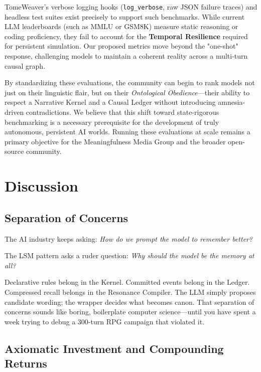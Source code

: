 \documentclass[12pt, a4paper]{article}
\begin{document}
TomeWeaver's verbose logging hooks (\texttt{log\_verbose}, raw JSON failure traces) and headless test suites exist precisely to support such benchmarks. While current LLM leaderboards (such as MMLU or GSM8K) measure static reasoning or coding proficiency, they fail to account for the \textbf{Temporal Resilience} required for persistent simulation. Our proposed metrics move beyond the "one-shot" response, challenging models to maintain a coherent reality across a multi-turn causal graph. 

By standardizing these evaluations, the community can begin to rank models not just on their linguistic flair, but on their \textit{Ontological Obedience}---their ability to respect a Narrative Kernel and a Causal Ledger without introducing amnesia-driven contradictions. We believe that this shift toward state-rigorous benchmarking is a necessary prerequisite for the development of truly autonomous, persistent AI worlds. Running these evaluations at scale remains a primary objective for the Meaningfulness Media Group and the broader open-source community.



\newpage
\section{Discussion}
\label{sec:discussion}

\subsection{Separation of Concerns}

The AI industry keeps asking: \textit{How do we prompt the model to remember better?} 

The LSM pattern asks a ruder question: \textit{Why should the model be the memory at all?} 

Declarative rules belong in the Kernel. Committed events belong in the Ledger. Compressed recall belongs in the Resonance Compiler. The LLM simply proposes candidate wording; the wrapper decides what becomes canon. That separation of concerns sounds like boring, boilerplate computer science---until you have spent a week trying to debug a 300-turn RPG campaign that violated it. 

\subsection{Axiomatic Investment and Compounding Returns}
\end{document}
